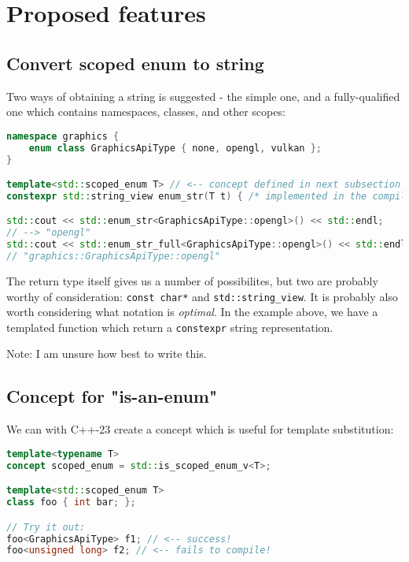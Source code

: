 \documentclass[
  format=manuscript,
  screen=true,
  review=false,
  nonacm=true,
  timestamp=true,
  balance=false]{acmart}
\begin{document}
\section{Proposed features}

\subsection{Convert scoped enum to string}

Two ways of obtaining a string is suggested - the simple one, and a fully-qualified
one which contains namespaces, classes, and other scopes:\vspace{2mm}

\begin{lstlisting}[language=Cpp]
namespace graphics {
    enum class GraphicsApiType { none, opengl, vulkan };
}

template<std::scoped_enum T> // <-- concept defined in next subsection
constexpr std::string_view enum_str(T t) { /* implemented in the compiler */ }

std::cout << std::enum_str<GraphicsApiType::opengl>() << std::endl;
// --> "opengl"
std::cout << std::enum_str_full<GraphicsApiType::opengl>() << std::endl;
// "graphics::GraphicsApiType::opengl"
\end{lstlisting}

\noindent
The return type itself gives us a number of possibilites, but two are probably worthy
of consideration: \texttt{const char*} and \texttt{std::string\_view}. It is probably
also worth considering what notation is \textit{optimal}. In the example above, we
have a templated function which return a \texttt{constexpr} string representation.

\vspace{2mm}\noindent
Note: I am unsure how best to write this.


\subsection{Concept for "is-an-enum"}

We can with C++-23 create a concept which is useful for template substitution:\vspace{2mm}

\begin{lstlisting}[language=Cpp]
template<typename T>
concept scoped_enum = std::is_scoped_enum_v<T>;

template<std::scoped_enum T>
class foo { int bar; };

// Try it out:
foo<GraphicsApiType> f1; // <-- success!
foo<unsigned long> f2; // <-- fails to compile!
\end{lstlisting}
\end{document}
